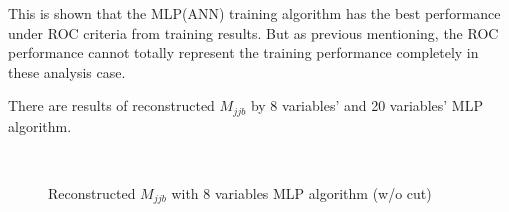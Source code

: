 			This is shown that the MLP(ANN) training algorithm has the best performance under ROC criteria from training results. But as previous mentioning, the ROC performance cannot totally represent the training performance completely in these analysis case.

			There are results of reconstructed $M_{jjb}$ by 8 variables' and 20 variables' MLP algorithm.

			\begin{figure}[H]
			\centering
			    \\
			\caption{Reconstructed $M_{jjb}$ with 8 variables MLP algorithm (w/o cut)}
			\label{EventSelReco:fig:t13_MLP_SR_NC_Mjjb}
			\end{figure}
			\FloatBarrier

